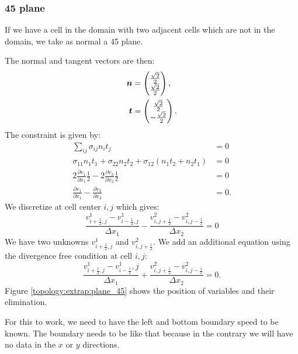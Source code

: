 \subsubsection{\unit{45}{\degree} plane}

If we have a cell in the domain with two adjacent cells which are not in the domain,
we take as normal a \unit{45}{\degree} plane.

The normal and tangent vectors are then:
\begin{align}
	{\boldsymbol {n}}&=\begin{pmatrix}
	\frac{\sqrt{2}}{2}\\
	\frac{\sqrt{2}}{2}
	\end{pmatrix},\\
	{\boldsymbol {t}}&=\begin{pmatrix}
			\frac{\sqrt{2}}{2}\\
			-\frac{\sqrt{2}}{2}
		\end{pmatrix}.
\end{align}
The constraint is given by:
\begin{align}
	\sum_{ij}\sigma_{ij}n_{i}t_{j}&=0\\
	\sigma_{11}n_{1}t_{1}+\sigma_{22}n_{2}t_{2}+\sigma_{12}(n_{1}t_{2}+n_{2}t_{1})&=0\\
	2\frac{\partial v_{1}}{\partial x_{1}}\frac{1}{2}-2\frac{\partial v_{2}}{\partial x_{2}}\frac{1}{2}&=0\\
	\frac{\partial v_{1}}{\partial x_{1}}-\frac{\partial v_{2}}{\partial x_{2}}&=0.
\end{align}
We discretize at cell center $i,j$ which gives:
\begin{equation}
	\frac{v^{1}_{i+\frac{1}{2},j}-v^{1}_{i-\frac{1}{2},j}}{\Delta x_{1}}-\frac{v^{2}_{i,j+\frac{1}{2}}-v^{2}_{i,j-\frac{1}{2}}}{\Delta x_{2}}=0
\end{equation}
We have two unknowns $v^{1}_{i+\frac{1}{2},j}$ and $v^{2}_{i,j+\frac{1}{2}}$.
We add an additional equation using the divergence free condition at cell $i,j$:
\begin{equation}
	\frac{v^{1}_{i+\frac{1}{2},j}-v^{1}_{i-\frac{1}{2}},j}{\Delta x_{1}}+\frac{v^{2}_{i,j+\frac{1}{2}}-v^{2}_{i,j-\frac{1}{2}}}{\Delta x_2}=0.
\end{equation}
Figure \ref{topology:extrap:plane_45} shows the position of variables and  their elimination.

For this to work, we need to have the left and bottom boundary speed to be known.
The boundary needs to be like that because in the contrary we will have no data in the $x$ or $y$ directions.

